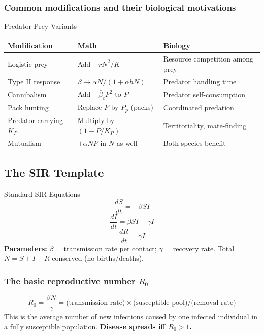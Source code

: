 \documentclass[11pt]{article}
\begin{document}
\subsubsection{Common modifications and their biological motivations}

\begin{summarybox}{Predator-Prey Variants}
\renewcommand{\arraystretch}{1.4}
\begin{tabular}{p{4cm}p{5cm}p{6cm}}
\toprule
\textbf{Modification} & \textbf{Math} & \textbf{Biology}\\
\midrule
Logistic prey & Add $-rN^2/K$ & Resource competition among prey\\
Type II response & $\bar\beta \to \alpha N/(1+\alpha h N)$ & Predator handling time\\
Cannibalism & Add $-\bar\beta_c P^2$ to $\dot P$ & Predator self-consumption\\
Pack hunting & Replace $P$ by $P_p$ (packs) & Coordinated predation\\
Predator carrying $K_P$ & Multiply by $(1-P/K_P)$ & Territoriality, mate-finding\\
Mutualism & $+\alpha NP$ in $\dot N$ as well & Both species benefit\\
\bottomrule
\end{tabular}
\end{summarybox}

\subsection{The SIR Template}

\begin{conceptbox}{Standard SIR Equations}
\[
\frac{dS}{dt} = -\beta SI
\]
\[
\frac{dI}{dt} = \beta SI - \gamma I
\]
\[
\frac{dR}{dt} = \gamma I
\]
\textbf{Parameters:} $\beta$ = transmission rate per contact; $\gamma$ = recovery rate. Total $N = S+I+R$ conserved (no births/deaths).
\end{conceptbox}

\subsubsection{The basic reproductive number $R_0$}
\[
R_0 = \frac{\beta N}{\gamma} = \text{(transmission rate)}\times\text{(susceptible pool)}/\text{(removal rate)}
\]
This is the average number of new infections caused by one infected individual in a fully susceptible population. \textbf{Disease spreads iff $R_0 > 1$.}
\end{document}
